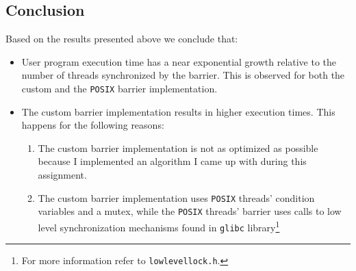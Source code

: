 \documentclass{article}
\def\code#1{\texttt{#1}}
\begin{document}


\subsection{Conclusion}
Based on the results presented above we conclude that:

\begin{itemize}
 \item User program execution time has a near exponential growth relative to the number of
       threads synchronized by the barrier. This is observed for both the custom and the
       \texttt{POSIX} barrier implementation.
 \item The custom barrier implementation results in higher execution times. This happens
       for the following reasons:
       \begin{enumerate}
         \item The custom barrier implementation is not as optimized as possible because I
         implemented an algorithm I came up with during this assignment.
         \item The custom barrier implementation uses \texttt{POSIX} threads' condition variables
         and a mutex, while the \texttt{POSIX} threads' barrier uses calls to low level synchronization
         mechanisms found in \code{glibc} library\footnote{For more information refer to \code{lowlevellock.h}.}
       \end{enumerate}
\end{itemize}
\end{document}

